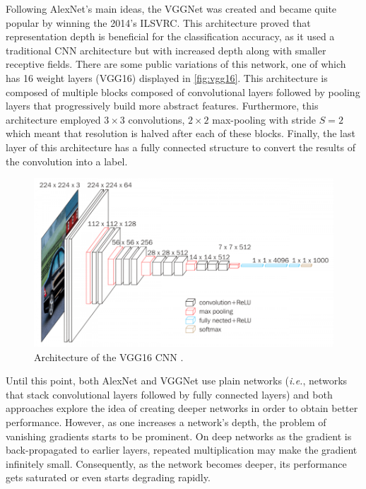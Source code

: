     Following AlexNet's main ideas, the VGGNet \cite{vggnet} was created and became quite popular by winning the 2014’s \ac{ILSVRC}. This architecture proved that representation depth is beneficial for the classification accuracy, as it used a traditional \ac{CNN} architecture but with increased depth along with smaller receptive fields. There are some public variations of this network, one of which has 16 weight layers (VGG16) displayed in \autoref{fig:vgg16}. This architecture is composed of multiple blocks composed of convolutional layers followed by pooling layers that progressively build more abstract features. Furthermore, this architecture employed $3 \times 3$ convolutions, $2 \times 2$ max-pooling with stride $S=2$ which meant that resolution is halved after each of these blocks. Finally, the last layer of this architecture has a fully connected structure to convert the results of the convolution into a label.  \par
    \begin{figure}[ht]
      \centering
        \includegraphics[width=0.8\linewidth]{figs/vgg16.png}
      \caption{Architecture of the VGG16 \ac{CNN} \cite{vggnet}.}
      \label{fig:vgg16}
    \end{figure}
    \par
    Until this point, both AlexNet and VGGNet use plain networks (\textit{i.e.}, networks that stack convolutional layers followed by fully connected layers) and both approaches explore the idea of creating deeper networks in order to obtain better performance. However, as one increases a network's depth, the problem of vanishing gradients starts to be prominent. On deep networks as the gradient is back-propagated to earlier layers, repeated multiplication may make the gradient infinitely small. Consequently, as the network becomes deeper, its performance gets saturated or even starts degrading rapidly. \par
    
